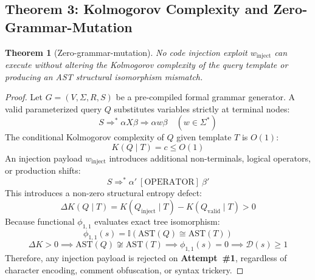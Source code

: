 \documentclass{portalciencia}
\theoremstyle{plain}
\newtheorem{theorem}{Theorem}
\theoremstyle{definition}
\begin{document}
\subsection{Theorem 3: Kolmogorov Complexity and Zero-Grammar-Mutation}

\begin{theorem}[Zero-grammar-mutation]
No code injection exploit $w_{\mathrm{inject}}$ can execute without altering the Kolmogorov complexity of the query template or producing an AST structural isomorphism mismatch.
\end{theorem}

\begin{proof}
Let $G = (V, \Sigma, R, S)$ be a pre-compiled formal grammar generator. A valid parameterized query $Q$ substitutes variables strictly at terminal nodes:
\begin{equation}
\label{eq:grammar}
S \Longrightarrow^{*} \alpha X \beta \Longrightarrow \alpha w \beta \quad (w \in \Sigma^{*})
\end{equation}
The conditional Kolmogorov complexity of $Q$ given template $T$ is $O(1)$:
\begin{equation}
\label{eq:kolmogorov}
K(Q \mid T) = c \le O(1)
\end{equation}
An injection payload $w_{\mathrm{inject}}$ introduces additional non-terminals, logical operators, or production shifts:
\begin{equation}
\label{eq:injection}
S \Longrightarrow^{*} \alpha'\ [\mathrm{OPERATOR}]\ \beta'
\end{equation}
This introduces a non-zero structural entropy defect:
\begin{equation}
\label{eq:deltak}
\Delta K(Q \mid T) = K(Q_{\mathrm{inject}} \mid T) - K(Q_{\mathrm{valid}} \mid T) > 0
\end{equation}
Because functional $\phi_{1,1}$ evaluates exact tree isomorphism:
\begin{equation}
\label{eq:astiso}
\phi_{1,1}(s) = \mathbb{I}\left( \mathrm{AST}(Q) \cong \mathrm{AST}(T) \right)
\end{equation}
\begin{equation}
\label{eq:astchain}
\Delta K > 0 \implies \mathrm{AST}(Q) \not\cong \mathrm{AST}(T) \implies \phi_{1,1}(s) = 0 \implies \mathcal{D}(s) \ge 1
\end{equation}
Therefore, any injection payload is rejected on \textbf{Attempt~\#1}, regardless of character encoding, comment obfuscation, or syntax trickery.
\end{proof}
\end{document}

